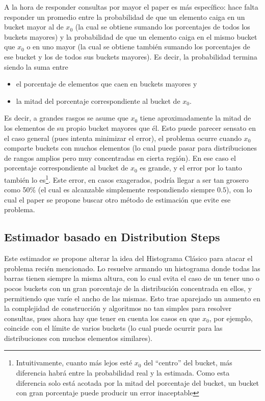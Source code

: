 A la hora de responder consultas por mayor el paper es más específico: hace falta responder un promedio entre la probabilidad de que un elemento caiga en un bucket mayor al de $x_0$ (la cual se obtiene sumando los porcentajes de todos los buckets mayores) y la probabilidad de que un elemento caiga en el mismo bucket que $x_0$ o en uno mayor (la cual se obtiene también sumando los porcentajes de ese bucket y los de todos sus buckets mayores). Es decir, la probabilidad termina siendo la suma entre
\begin{itemize}
 \item el porcentaje de elementos que caen en buckets mayores y
 \item la mitad del porcentaje correspondiente al bucket de $x_0$.
\end{itemize}
Es decir, a grandes rasgos se asume que $x_0$ tiene aproximadamente la mitad de los elementos de su propio bucket mayores que él. Esto puede parecer sensato en el caso general (pues intenta minimizar el error), el problema ocurre cuando $x_0$ comparte buckets con muchos elementos (lo cual puede pasar para distribuciones de rangos amplios pero muy concentradas en cierta región). En ese caso el porcentaje correspondiente al bucket de $x_0$ es grande, y el error por lo tanto también lo es\footnote{Intuitivamente, cuanto más lejos esté $x_0$ del ``centro'' del bucket, más diferencia habrá entre la probabilidad real y la estimada. Como esta diferencia solo está acotada por la mitad del porcentaje del bucket, un bucket con gran porcentaje puede producir un error inaceptable}. Este error, en casos exagerados, podría llegar a ser tan grosero como 50\% (el cual es alcanzable simplemente respondiendo siempre $0.5$), con lo cual el paper se propone buscar otro método de estimación que evite ese problema.

\subsection{Estimador basado en Distribution Steps}
Este estimador se propone alterar la idea del Histograma Clásico para atacar el problema recién mencionado. Lo resuelve armando un histograma donde todas las barras tienen siempre la misma altura, con lo cual evita el caso de un tener uno o pocos buckets con un gran porcentaje de la distribución concentrada en ellos, y permitiendo que varíe el ancho de las mismas. Esto trae aparejado un aumento en la complejidad de construcción y algoritmos no tan simples para resolver consultas, pues ahora hay que tener en cuenta los casos en que $x_0$, por ejemplo, coincide con el límite de varios buckets (lo cual puede ocurrir para las distribuciones con muchos elementos similares).

